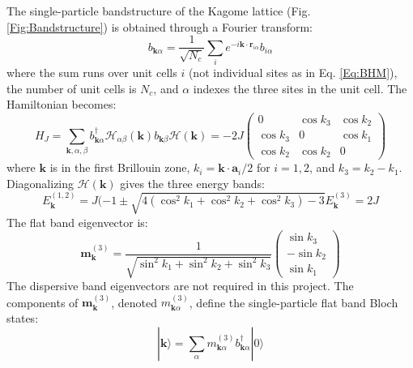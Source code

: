 The single-particle bandstructure of the Kagome lattice (Fig. \ref{Fig:Bandstructure}) is obtained through a Fourier transform:
\begin{equation}\label{Eq:OperatorFT}
    b_{\textbf{k}\alpha}=\frac{1}{\sqrt{N_c}}\sum_{i}e^{-i\textbf{k}\cdot\textbf{r}_{i\alpha}}b_{i\alpha}
\end{equation}
where the sum runs over unit cells $i$ (not individual sites as in Eq. \ref{Eq:BHM}), the number of unit cells is $N_c$, and $\alpha$ indexes the three sites in the unit cell. The Hamiltonian becomes:
\begin{subequations}\label{Eq:MomentumBH}
\begin{equation}
H_J=\sum_{\textbf{k},\alpha,\beta} b_{\textbf{k}\alpha}^{\dag} \mathcal{H}_{\alpha \beta}(\textbf{k}) b_{\textbf{k}\beta}
\end{equation}
\begin{equation}
\mathcal{H}(\textbf{k}) = -2J
    \begin{pmatrix}
    0 & \cos k_3 & \cos k_2 \\
    \cos k_3 & 0 & \cos k_1 \\
    \cos k_2 & \cos k_2 & 0 
    \end{pmatrix}
\end{equation}
\end{subequations}
where $\textbf{k}$ is in the first Brillouin zone, $k_i=\textbf{k}\cdot\textbf{a}_i/2$ for $i=1,2$, and $k_3=k_2-k_1$. Diagonalizing $\mathcal{H}(\textbf{k})$ gives the three energy bands:
\begin{subequations}\label{Eq:BandEnergies}
    \begin{equation}\label{Eq:MobileBandEnergies}
        E_\textbf{k}^{(1,2)}=J(-1\pm\sqrt{4(\cos^2 k_1 + \cos^2 k_2 + \cos^2 k_3) - 3}
    \end{equation}
    \begin{equation}\label{Eq:FBEnergy}
        E_\textbf{k}^{(3)}=2J
    \end{equation}
\end{subequations}
The flat band eigenvector is:
\begin{equation}\label{Eq:FBEigenvector}
    \textbf{m}_{\textbf{k}}^{(3)}=\frac{1}{\sqrt{\sin^2 k_1+\sin^2 k_2 + \sin^2 k_3}}
    \begin{pmatrix}
        \sin k_3 \\
        -\sin k_2 \\
        \sin k_1
    \end{pmatrix}
\end{equation}
The dispersive band eigenvectors are not required in this project. The components of $\textbf{m}_{\textbf{k}}^{(3)}$, denoted $m_{\textbf{k}\alpha}^{(3)}$, define the single-particle flat band Bloch states:
\begin{equation}\label{Eq:FBBlochState}
    |\textbf{k}\rangle=\sum_{\alpha} m_{\textbf{k}\alpha}^{(3)} b_{\textbf{k}\alpha}^{\dag}|0\rangle
\end{equation}

